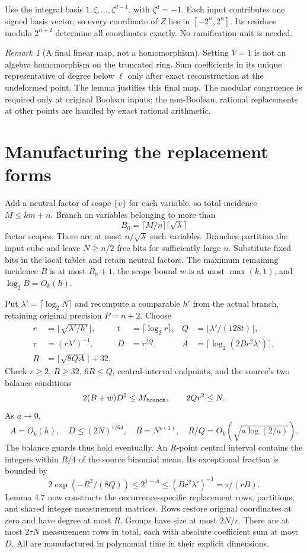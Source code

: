 \documentclass[11pt,a4paper]{article}
\theoremstyle{remark}\newtheorem{remark}[theorem]{Remark}
\begin{document}
Use the integral basis $1,\zeta,\ldots,\zeta^{d-1}$, with
$\zeta^d=-1$. Each input contributes one signed basis vector, so every
coordinate of $Z$ lies in $[-2^n,2^n]$. Its residues modulo $2^{n+2}$
determine all coordinates exactly. No ramification unit is needed.

\begin{remark}[A final linear map, not a homomorphism]
Setting $V=1$ is not an algebra homomorphism on the truncated ring.
Sum coefficients in its unique representative of degree below $\ell$
only after exact reconstruction at the undeformed point. The lemma
justifies this final map. The modular congruence is required only at
original Boolean inputs; the non-Boolean, rational replacements at
other points are handled by exact rational arithmetic.
\end{remark}

\section{Manufacturing the replacement forms}\label{sec:guards}
Add a neutral factor of scope $\{v\}$ for each variable, so total
incidence $M\le km+n$. Branch on variables belonging to more than
\[
 B_0=\lceil M/n\rceil\lceil\sqrt\lambda\rceil
\]
factor scopes. There are at most $n/\sqrt\lambda$ such variables.
Branches partition the input cube and leave $N\ge n/2$ free bits
for sufficiently large $n$. Substitute fixed bits in the local tables
and retain neutral factors. The maximum remaining incidence $B$ is at
most $B_0+1$, the scope bound $w$ is at most $\max(k,1)$, and
$\log_2B=O_k(h)$.

Put $\lambda'=\lceil\log_2N\rceil$ and recompute a comparable $h'$ from
the actual branch, retaining original precision $P=n+2$. Choose
\begin{align*}
 r&=\lfloor\sqrt{\lambda'/h'}\rfloor,&
 t&=\lceil\log_2r\rceil,&Q&=\lfloor\lambda'/(128t)\rfloor,\\
 \tau&=(r\lambda')^{-1},&D&=r^{2Q},&
 A&=\lceil\log_2(2Br^2\lambda')\rceil,\\
 R&=\lceil\sqrt{8QA}\rceil+32.
\end{align*}
Check $r\ge2$, $R\ge32$, $6R\le Q$, central-interval endpoints, and
the source's two balance conditions
\[
 2(B+w)D^2\le M_{\rm branch},\qquad 2Qr^2\le N.
\]
As $a\to0$,
\[
 A=O_k(h),\quad D\le(2N)^{1/64},\quad B=N^{o(1)},\quad
 R/Q=O_k(\sqrt{a\log(2/a)}).
\]
The balance guards thus hold eventually. An $R$-point central interval
contains the integers within $R/4$ of the source binomial mean. Its
exceptional fraction is bounded by
\[
 2\exp(-R^2/(8Q))\le 2^{1-A}
 \le (Br^2\lambda')^{-1}=\tau/(rB).
\]
Lemma 4.7 now constructs the occurrence-specific replacement rows,
partitions, and shared integer measurement matrices. Rows restore
original coordinates at zero and have degree at most $R$. Groups have
size at most $2N/r$. There are at most $2\tau N$ measurement rows in
total, each with absolute coefficient sum at most $D$. All are
manufactured in polynomial time in their explicit dimensions.
\end{document}
